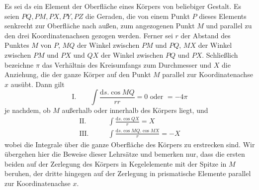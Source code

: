 Es sei $\mathrm{d}s$ ein Element der Oberfläche eines Körpers von beliebiger Gestalt. Es seien $PQ,PM,PX,PY,PZ$ die Geraden, die von einem Punkt $P$ dieses Elements senkrecht zur Oberfläche nach außen, zum angezogenen Punkt $M$ und parallel zu den drei Koordinatenachsen gezogen werden. Ferner sei $r$ der Abstand des Punktes $M$ von $P$, $MQ$ der Winkel zwischen $PM$ und $PQ$, $MX$ der Winkel zwischen $PM$ und $PX$ und $QX$ der Winkel zwischen $PQ$ und $PX$. Schließlich bezeichne $\pi$ das Verhältnis des Kreisumfangs zum Durchmesser und $X$ die Anziehung, die der ganze Körper auf den Punkt $M$ parallel zur Koordinatenachse $x$ ausübt. Dann gilt
\[
\text{I.}\qquad \int\frac{\mathrm{d}s.\cos MQ}{rr}=0\text{ oder }=-4\pi
\]
je nachdem, ob $M$ außerhalb oder innerhalb des Körpers liegt, und
\[
\begin{aligned}
\text{II.}\qquad &\int\frac{\mathrm{d}s.\cos QX}{r}=X\\
\text{III.}\qquad &\int\frac{\mathrm{d}s.\cos MQ.\cos MX}{r}=-X
\end{aligned}
\]
wobei die Integrale über die ganze Oberfläche des Körpers zu erstrecken sind. Wir übergehen hier die Beweise dieser Lehrsätze und bemerken nur, dass die ersten beiden auf der Zerlegung des Körpers in Kegelelemente mit der Spitze in $M$ beruhen, der dritte hingegen auf der Zerlegung in prismatische Elemente parallel zur Koordinatenachse $x$.

